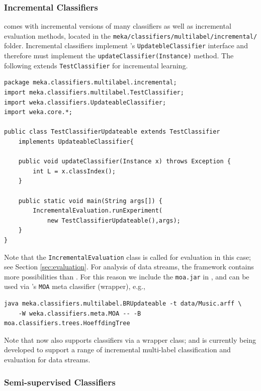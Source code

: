 \documentclass[11pt]{article}
\newcommand{\MEKA}{Meka}
\newcommand{\MOA}{Moa}
\newcommand{\WEKA}{Weka}
\begin{document}
\subsubsection{Incremental Classifiers}

\framework{\MEKA} comes with incremental versions of many classifiers as well as incremental evaluation methods, located in the \texttt{meka/classifiers/multilabel/incremental/} folder. Incremental classifiers implement \framework{\WEKA}'s \texttt{UpdatebleClassifier} interface and therefore must implement the \texttt{updateClassifier(Instance)} method. The following extends \texttt{TestClassifier} for incremental learning.

{
\small
\lstset{basicstyle=\small\ttfamily,breaklines=true,language=java,frame=L,xleftmargin=\parindent}
\begin{lstlisting}
package meka.classifiers.multilabel.incremental;
import meka.classifiers.multilabel.TestClassifier;
import weka.classifiers.UpdateableClassifier;
import weka.core.*;

public class TestClassifierUpdateable extends TestClassifier 
    implements UpdateableClassifier{
	
    public void updateClassifier(Instance x) throws Exception {
        int L = x.classIndex();
    }
    
    public static void main(String args[]) {
        IncrementalEvaluation.runExperiment(
            new TestClassifierUpdateable(),args);
    }
}
\end{lstlisting}
}

Note that the \texttt{IncrementalEvaluation} class is called for evaluation in this case; see Section \ref{sec:evaluation}. For analysis of data streams, the \framework{\MOA} framework \cite{MOA} contains more possibilities than \framework{\WEKA}. For this reason we include the \texttt{moa.jar} in \framework{\MEKA}, and can be used via 's \texttt{MOA} meta classifier (wrapper), e.g., 
\begin{lstlisting}
java meka.classifiers.multilabel.BRUpdateable -t data/Music.arff \
	-W weka.classifiers.meta.MOA -- -B moa.classifiers.trees.HoeffdingTree
\end{lstlisting}

Note that \framework{\MOA} now also supports \framework{\MEKA} classifiers via a wrapper class; and is currently being developed to support a range of incremental multi-label classification and evaluation for data streams.

\subsubsection{Semi-supervised Classifiers}
\end{document}
